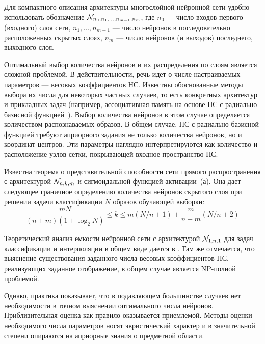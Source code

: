 Для компактного описания архитектуры многослойной нейронной сети
удобно использовать обозначение $\mathcal{N}_{n_0,n_1,\ldots,n_{m-1},n_m}$,
где $n_0$ --- число входов первого (входного) слоя сети,
$n_1,\ldots,n_{m-1}$ --- число нейронов в последовательно
расположенных скрытых слоях, $n_m$ --- число нейронов (и выходов)
последнего, выходного слоя.


Оптимальный выбор количества нейронов и их распределения по слоям
является сложной проблемой.  В действительности, речь идет о числе
настраиваемых параметров --- весовых коэффициентов НС.  Известны
обоснованные методы выбора их числа для некоторых частных случаев, то
есть конкретных архитектур и прикладных задач (например, ассоциативная
память на основе НС с радиально-базисной функцией~\cite{koh80}).
Выбор количества нейронов в этом случае определяется количеством
распознаваемых образов.  В общем случае, НС с радиально-базисной
функцией требуют априорного задания не только количества нейронов, но
и координат центров.  Эти параметры наглядно интерпретируются как
количество и расположение узлов сетки, покрывающей входное
пространство НС.

Известна теорема  о представительной
способности сети прямого распространения с архитектурой $\mathcal{N}_{n,k,m}$
и сигмоидальной функцией активации~(а).  Она дает
следующее граничное определению количества нейронов скрытого слоя при
решении задачи классификации $N$ образов обучающей выборки:
\begin{equation}\label{eq:neuron-number}
\displaystyle\frac{mN}{(n+m)(1+\log_2N)} \le k \le
m(N/n+1)+\displaystyle\frac{m}{n+m}(N/n+2)
\end{equation}

Теоретический анализ емкости нейронной сети с архитектурой
$\mathcal{N}_{1,n,1}$ для задач классификации и интерполяции в общем виде
дается в \cite{sontag93}.  Там же отмечается, что выяснение
существования заданного числа весовых коэффициентов НС, реализующих
заданное отображение, в общем случае является NP-полной проблемой.

Однако, практика показывает, что в подавляющем большинстве случаев нет
необходимости в точном выяснении оптимального числа нейронов.
Приблизительная оценка как правило оказывается приемлемой.  Методы
оценки необходимого числа параметров носят эвристический характер и в
значительной степени опираются на априорные знания о предметной
области.

